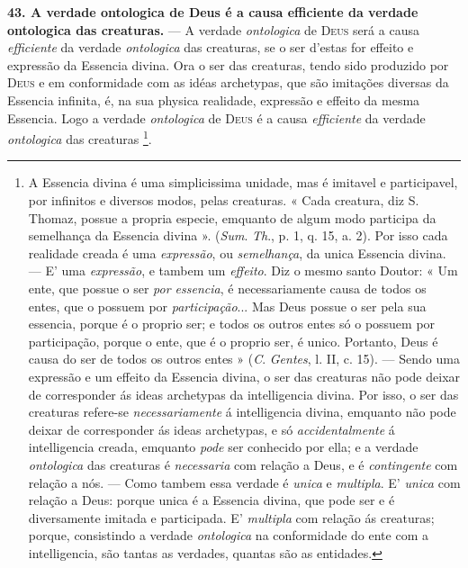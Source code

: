  \textbf{43. A verdade ontologica de Deus é a causa efficiente da verdade ontologica das creaturas.} --- A verdade \emph{ontologica} de \textsc{Deus} será a causa \emph{efficiente} da verdade \emph{ontologica} das creaturas, se o ser d'estas for effeito e expressão da Essencia divina. Ora o ser das creaturas, tendo sido produzido por \textsc{Deus} e em conformidade com as idéas archetypas, que são imitações diversas da Essencia infinita, é, na sua physica realidade, expressão e effeito da mesma Essencia. Logo a verdade \emph{ontologica} de \textsc{Deus} é a causa \emph{efficiente} da verdade \emph{ontologica} das creaturas \footnote{A Essencia divina é uma simplicissima unidade, mas é imitavel e participavel, por infinitos e diversos modos, pelas creaturas. « Cada creatura, diz S. Thomaz, possue a propria especie, emquanto de algum modo participa da semelhança da Essencia divina ». (\emph{Sum}. \emph{Th}., p. 1, q. 15, a. 2). Por isso cada realidade creada é uma \emph{expressão}, ou \emph{semelhança}, da unica Essencia divina. --- E' uma \emph{expressão}, e tambem um \emph{effeito}. Diz o mesmo santo Doutor: « Um ente, que possue o ser \emph{por essencia}, é necessariamente causa de todos os entes, que o possuem por \emph{participação}... Mas Deus possue o ser pela sua essencia, porque é o proprio ser; e todos os outros entes só o possuem por participação, porque o ente, que é o proprio ser, é unico. Portanto, Deus é causa do ser de todos os outros entes » (\emph{C}. \emph{Gentes}, l. II, c. 15). --- Sendo uma expressão e um effeito da Essencia divina, o ser das creaturas não pode deixar de corresponder ás ideas archetypas da intelligencia divina. Por isso, o ser das creaturas refere-se \emph{necessariamente} á intelligencia divina, emquanto não pode deixar de corresponder ás ideas archetypas, e só \emph{accidentalmente} á intelligencia creada, emquanto \emph{pode} ser conhecido por ella; e a verdade \emph{ontologica} das creaturas é \emph{necessaria} com relação a Deus, e é \emph{contingente} com relação a nós. --- Como tambem essa verdade é \emph{unica} e \emph{multipla}. E' \emph{unica} com relação a Deus: porque unica é a Essencia divina, que pode ser e é diversamente imitada e participada. E' \emph{multipla} com relação ás creaturas; porque, consistindo a verdade \emph{ontologica} na conformidade do ente com a intelligencia, são tantas as verdades, quantas são as entidades.}.

